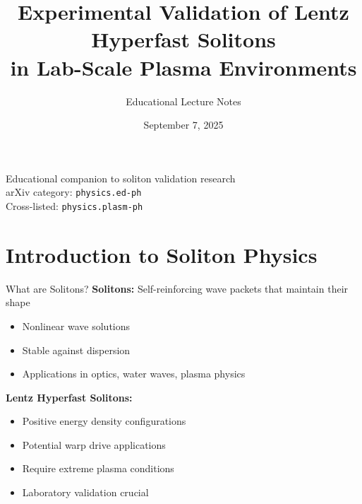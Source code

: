 \documentclass[aspectratio=169,xcolor={table,dvipsnames}]{beamer}
\title[Soliton Validation]{Experimental Validation of Lentz Hyperfast Solitons\\in Lab-Scale Plasma Environments}
\subtitle{Educational Lecture Notes}
\author[\authorname]{\authorname}
\institute[Independent Researcher]{Independent Researcher}
\date{September 7, 2025}
\begin{document}
\begin{frame}
    \titlepage
    \begin{center}
        \small
        Educational companion to soliton validation research\\
        \vspace{0.3cm}
        arXiv category: \texttt{physics.ed-ph}\\
        Cross-listed: \texttt{physics.plasm-ph}
    \end{center}
\end{frame}

\section{Introduction to Soliton Physics}

\begin{frame}{What are Solitons?}
    \textbf{Solitons:} Self-reinforcing wave packets that maintain their shape
    \begin{itemize}
        \item Nonlinear wave solutions
        \item Stable against dispersion
        \item Applications in optics, water waves, plasma physics
    \end{itemize}
    
    \vspace{0.5cm}
    \textbf{Lentz Hyperfast Solitons:}
    \begin{itemize}
        \item Positive energy density configurations
        \item Potential warp drive applications
        \item Require extreme plasma conditions
        \item Laboratory validation crucial
    \end{itemize}
\end{frame}
\end{document}
